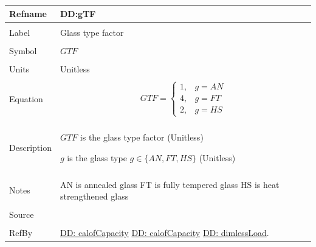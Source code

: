 \documentclass[12pt]{article}
\begin{document}
\noindent \begin{minipage}{\textwidth}
\begin{tabular}{p{} p{}}
\toprule \textbf{Refname} & \textbf{DD:gTF}
\label{DD:gTF}
\\ \midrule \\
Label & Glass type factor
        \\ \midrule \\
        Symbol & $GTF$
                 \\ \midrule \\
                 Units & Unitless
                         \\ \midrule \\
                         Equation & \begin{displaymath}
                                    GTF=\begin{cases}
1, & g=AN\\
4, & g=FT\\
2, & g=HS
\end{cases}
                                    \end{displaymath}
                                    \\ \midrule \\
                                    Description & \begin{symbDescription}
                                                  \item{$GTF$ is the glass type factor (Unitless)}
                                                  \item{$g$ is the glass type $g\in{}\{AN,FT,HS\}$ (Unitless)}
                                                  \end{symbDescription}
                                                  \\ \midrule \\
                                                  Notes & AN is annealed glass
                                                          FT is fully tempered glass
                                                          HS is heat strengthened glass
                                                          \\ \midrule \\
                                                          Source & \cite{astm2009}
                                                                   \\ \midrule \\
                                                                   RefBy & \hyperref[DD:calofCapacity]{DD: calofCapacity} \hyperref[DD:calofCapacity]{DD: calofCapacity} \hyperref[DD:dimlessLoad]{DD: dimlessLoad}.
\\ \bottomrule \end{tabular}
\end{minipage}
\par~
\end{document}
